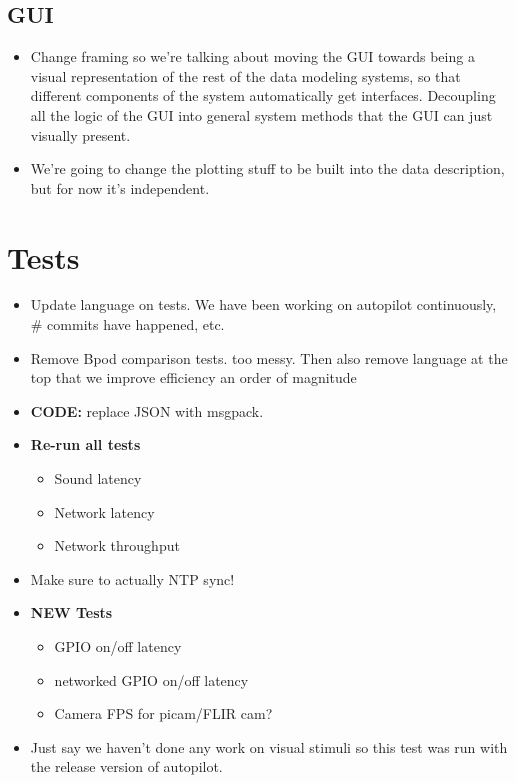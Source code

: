 \subsection{GUI}

\begin{itemize}
\item Change framing so we're talking about moving the GUI towards being a visual representation of the rest of the data modeling systems, so that different components of the system automatically get interfaces. Decoupling all the logic of the GUI into general system methods that the GUI can just visually present.
\item We're going to change the plotting stuff to be built into the data description, but for now it's independent.
\end{itemize}

\section{Tests}

\begin{itemize}
\item Update language on tests. We have been working on autopilot continuously, # commits have happened, etc.
\item Remove Bpod comparison tests. too messy. Then also remove language at the top that we improve efficiency an order of magnitude
\item \textbf{CODE:} replace JSON with msgpack.
\item \textbf{Re-run all tests} 
\begin{itemize}
\item Sound latency
\item Network latency
\item Network throughput
\end{itemize}
\item Make sure to actually NTP sync!
\item \textbf{NEW Tests}
\begin{itemize}
\item GPIO on/off latency
\item networked GPIO on/off latency
\item Camera FPS for picam/FLIR cam?
\end{itemize}
\item Just say we haven't done any work on visual stimuli so this test was run with the release version of autopilot.

\end{itemize}



